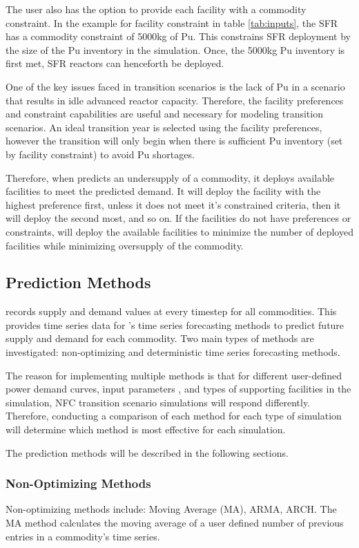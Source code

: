 The user also has the option to provide each facility with a 
commodity constraint. 
In the example for facility constraint in table \ref{tab:inputs}, 
the \gls{SFR} has a commodity constraint of 5000kg of Pu. 
This constrains \gls{SFR} deployment by the size of the Pu inventory 
in the simulation. 
Once, the 5000kg Pu inventory is first met, \gls{SFR} reactors can 
henceforth be deployed. 

One of the key issues faced in transition scenarios is the lack 
of Pu in a scenario that results in idle advanced reactor capacity. 
Therefore, the facility preferences and constraint capabilities 
are useful and necessary for modeling transition scenarios. 
An ideal transition year is selected using the facility 
preferences, however the transition will only begin when there 
is sufficient Pu inventory (set by facility constraint) 
to avoid Pu shortages. 

Therefore, when \deploy predicts an undersupply of a commodity, 
it deploys available facilities to meet the predicted demand. 
It will deploy the facility with the highest preference first, 
unless it does not meet it's constrained criteria, then it will 
deploy the second most, and so on. 
If the facilities do not have preferences or constraints, \deploy 
will deploy the available facilities to minimize the number of 
deployed facilities while minimizing oversupply of the commodity.

\subsection{Prediction Methods}
\Deploy records supply and demand values at every timestep for all 
commodities. 
This provides time series data for \deploy's time series 
forecasting methods to predict future supply and demand for each 
commodity.  
Two main types of methods are investigated: non-optimizing and 
deterministic time series forecasting methods.

The reason for implementing multiple methods is that for different 
user-defined power demand curves, \deploy input parameters
, and types of supporting facilities in the simulation,
\gls{NFC} transition scenario simulations will respond differently. 
Therefore, conducting a comparison of each method for each type of 
simulation will determine which method is most effective for 
each simulation. 

The prediction methods will be described in the following 
sections. 

\subsubsection{Non-Optimizing Methods}
Non-optimizing methods include: Moving Average (MA), \gls{ARMA}, 
\gls{ARCH}. 
The MA method calculates the moving average of 
a user defined number of previous entries in a commodity's 
time series. 

